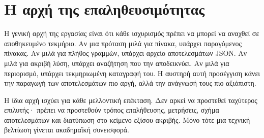 \section{Η αρχή της επαληθευσιμότητας}
\label{sec:validation-principle}
Η γενική αρχή της εργασίας είναι ότι κάθε ισχυρισμός πρέπει να μπορεί να αναχθεί σε αποθηκευμένο τεκμήριο. Αν μια πρόταση μιλά για πίνακα, υπάρχει παραγόμενος πίνακας. Αν μιλά για πλήθος γραμμών, υπάρχει αρχείο αποτελεσμάτων JSON. Αν μιλά για ακριβή λύση, υπάρχει αναζήτηση που την αποδεικνύει. Αν μιλά για περιορισμό, υπάρχει τεκμηριωμένη καταγραφή του. Η αυστηρή αυτή προσέγγιση κάνει την παραγωγή των αποτελεσμάτων πιο αργή, αλλά την ανάγνωσή τους πιο αξιόπιστη.

Η ίδια αρχή ισχύει για κάθε μελλοντική επέκταση. Δεν αρκεί να προστεθεί ταχύτερος επιλυτής· πρέπει να προστεθούν τρόπος επαλήθευσης, μετρήσεις, σχήμα αποτελεσμάτων και διατύπωση στο κείμενο εξίσου ακριβής. Μόνο τότε μια τεχνική βελτίωση γίνεται ακαδημαϊκή συνεισφορά.

